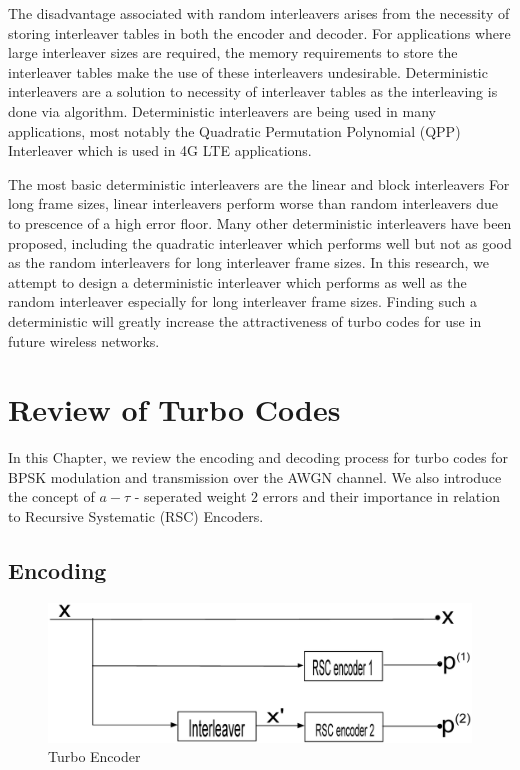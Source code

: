 \documentclass[a4paper, 12pt, oneside, openary]{jbook}
\begin{document}
The disadvantage associated with random interleavers arises from the necessity of 
storing interleaver tables in both the encoder and decoder. For applications where 
large interleaver sizes are required, the memory requirements to store the interleaver
tables make the use of these interleavers undesirable.  Deterministic interleavers
are a solution to necessity of interleaver tables as the interleaving is done via 
algorithm. Deterministic interleavers are being used in many applications, most 
notably the Quadratic Permutation Polynomial (QPP) Interleaver \cite{ref5} which is used 
in 4G LTE applications.

The most basic deterministic interleavers are the linear and block interleavers \cite{ref2}
For long frame sizes, linear interleavers perform worse
than random interleavers due to prescence of a high error floor. Many other 
deterministic interleavers have been proposed, including the quadratic interleaver
\cite{ref2} which performs well but not as good as the random interleavers for long
interleaver frame sizes. 
In this research, we attempt to design a deterministic interleaver which performs as well as the random interleaver especially for long interleaver frame sizes. Finding such a deterministic will greatly increase the attractiveness of turbo codes for use in future wireless networks.

\chapter{Review of Turbo Codes}

In this Chapter, we review the encoding and decoding process for turbo codes for BPSK
modulation and transmission over the AWGN channel. We also introduce the concept of $a-\tau$ - seperated weight $2$ errors and their importance in relation to Recursive Systematic (RSC) Encoders.
\section{Encoding}
\begin{figure}[h!]
\centering
		\includegraphics[width = \textwidth]{TurboEncoder.eps}
		\caption{Turbo Encoder}
		\label{TC}
		\end{figure}
	
\end{document}
